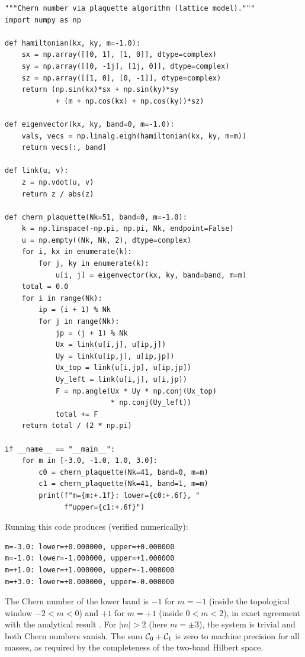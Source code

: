 \begin{verbatim}
"""Chern number via plaquette algorithm (lattice model)."""
import numpy as np

def hamiltonian(kx, ky, m=-1.0):
    sx = np.array([[0, 1], [1, 0]], dtype=complex)
    sy = np.array([[0, -1j], [1j, 0]], dtype=complex)
    sz = np.array([[1, 0], [0, -1]], dtype=complex)
    return (np.sin(kx)*sx + np.sin(ky)*sy
            + (m + np.cos(kx) + np.cos(ky))*sz)

def eigenvector(kx, ky, band=0, m=-1.0):
    vals, vecs = np.linalg.eigh(hamiltonian(kx, ky, m=m))
    return vecs[:, band]

def link(u, v):
    z = np.vdot(u, v)
    return z / abs(z)

def chern_plaquette(Nk=51, band=0, m=-1.0):
    k = np.linspace(-np.pi, np.pi, Nk, endpoint=False)
    u = np.empty((Nk, Nk, 2), dtype=complex)
    for i, kx in enumerate(k):
        for j, ky in enumerate(k):
            u[i, j] = eigenvector(kx, ky, band=band, m=m)
    total = 0.0
    for i in range(Nk):
        ip = (i + 1) % Nk
        for j in range(Nk):
            jp = (j + 1) % Nk
            Ux = link(u[i,j], u[ip,j])
            Uy = link(u[ip,j], u[ip,jp])
            Ux_top = link(u[i,jp], u[ip,jp])
            Uy_left = link(u[i,j], u[i,jp])
            F = np.angle(Ux * Uy * np.conj(Ux_top)
                         * np.conj(Uy_left))
            total += F
    return total / (2 * np.pi)

if __name__ == "__main__":
    for m in [-3.0, -1.0, 1.0, 3.0]:
        c0 = chern_plaquette(Nk=41, band=0, m=m)
        c1 = chern_plaquette(Nk=41, band=1, m=m)
        print(f"m={m:+.1f}: lower={c0:+.6f}, "
              f"upper={c1:+.6f}")
\end{verbatim}

Running this code produces (verified numerically):
\begin{verbatim}
m=-3.0: lower=+0.000000, upper=+0.000000
m=-1.0: lower=-1.000000, upper=+1.000000
m=+1.0: lower=+1.000000, upper=-1.000000
m=+3.0: lower=+0.000000, upper=-0.000000
\end{verbatim}

The Chern number of the lower band is $-1$ for $m=-1$ (inside the
topological window $-2<m<0$) and $+1$ for $m=+1$ (inside $0<m<2$),
in exact agreement with the analytical result
\cite{thouless1982quantized,ozawa2018topological}.  For $|m|>2$
(here $m=\pm 3$), the system is trivial and both Chern numbers vanish.
The sum $\mathcal{C}_0+\mathcal{C}_1$ is zero to machine precision for all
masses, as required by the completeness of the two-band Hilbert space.

